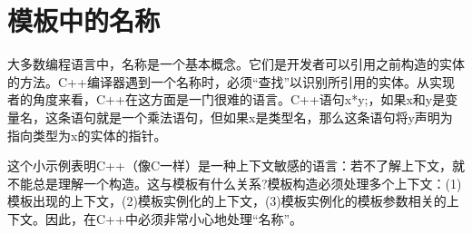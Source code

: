 \chapter{模板中的名称}
大多数编程语言中，名称是一个基本概念。它们是开发者可以引用之前构造的实体的方法。C++编译器遇到一个名称时，必须“查找”以识别所引用的实体。从实现者的角度来看，C++在这方面是一门很难的语言。C++语句x*y;，如果x和y是变量名，这条语句就是一个乘法语句，但如果x是类型名，那么这条语句将y声明为指向类型为x的实体的指针。

这个小示例表明C++（像C一样）是一种上下文敏感的语言：若不了解上下文，就不能总是理解一个构造。这与模板有什么关系?模板构造必须处理多个上下文：(1)模板出现的上下文，(2)模板实例化的上下文，(3)模板实例化的模板参数相关的上下文。因此，在C++中必须非常小心地处理“名称”。




